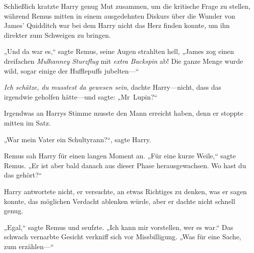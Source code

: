 Schließlich kratzte Harry genug Mut zusammen, um die kritische Frage zu stellen, während Remus mitten in einem ausgedehnten Diskurs über die Wunder von James' Quidditch war bei dem Harry nicht das Herz finden konnte, um ihn direkter zum Schweigen zu bringen.

„Und da war es,“ sagte Remus, seine Augen strahlten hell, „James zog einen dreifachen \emph{Mulhanney Sturzflug} mit \emph{extra Backspin} ab! Die ganze Menge wurde wild, sogar einige der Hufflepuffs jubelten—“

\emph{Ich schätze, du musstest da gewesen sein}, dachte Harry—nicht, dass das irgendwie geholfen hätte—und sagte: „Mr~Lupin?“

Irgendwas an Harrys Stimme musste den Mann erreicht haben, denn er stoppte mitten im Satz.

„War mein Vater ein Schultyrann?“, sagte Harry.

Remus sah Harry für einen langen Moment an. „Für eine kurze Weile,“ sagte Remus. „Er ist aber bald danach aus dieser Phase herausgewachsen. Wo hast du das gehört?“

Harry antwortete nicht, er versuchte, an etwas Richtiges zu denken, was er sagen konnte, das möglichen Verdacht ablenken würde, aber er dachte nicht schnell genug.

„Egal,“ sagte Remus und seufzte. „Ich kann mir vorstellen, wer es war.“ Das schwach vernarbte Gesicht verkniff sich vor Missbilligung. „Was für eine Sache, zum erzählen—“

